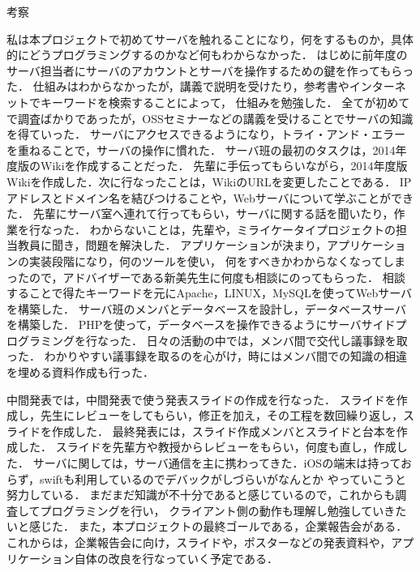 \par
考察
\par
私は本プロジェクトで初めてサーバを触れることになり，何をするものか，具体的にどうプログラミングするのかなど何もわからなかった．
はじめに前年度のサーバ担当者にサーバのアカウントとサーバを操作するための鍵を作ってもらった．
仕組みはわからなかったが，講義で説明を受けたり，参考書やインターネットでキーワードを検索することによって，
仕組みを勉強した．
全てが初めてで調査ばかりであったが，OSSセミナーなどの講義を受けることでサーバの知識を得ていった．
サーバにアクセスできるようになり，トライ・アンド・エラーを重ねることで，サーバの操作に慣れた．
サーバ班の最初のタスクは，2014年度版のWikiを作成することだった．
先輩に手伝ってもらいながら，2014年度版Wikiを作成した．次に行なったことは，WikiのURLを変更したことである．
IPアドレスとドメイン名を結びつけることや，Webサーバについて学ぶことができた．
先輩にサーバ室へ連れて行ってもらい，サーバに関する話を聞いたり，作業を行なった．
わからないことは，先輩や，ミライケータイプロジェクトの担当教員に聞き，問題を解決した．
アプリケーションが決まり，アプリケーションの実装段階になり，何のツールを使い，
何をすべきかわからなくなってしまったので，アドバイザーである新美先生に何度も相談にのってもらった．
相談することで得たキーワードを元にApache，LINUX，MySQLを使ってWebサーバを構築した．
サーバ班のメンバとデータベースを設計し，データベースサーバを構築した．
PHPを使って，データベースを操作できるようにサーバサイドプログラミングを行なった．
日々の活動の中では，メンバ間で交代し議事録を取った．
わかりやすい議事録を取るのを心がけ，時にはメンバ間での知識の相違を埋める資料作成も行った．
\par
中間発表では，中間発表で使う発表スライドの作成を行なった．
スライドを作成し，先生にレビューをしてもらい，修正を加え，その工程を数回繰り返し，スライドを作成した．
最終発表には，スライド作成メンバとスライドと台本を作成した．
スライドを先輩方や教授からレビューをもらい，何度も直し，作成した．
サーバに関しては，サーバ通信を主に携わってきた．iOSの端末は持っておらず，swiftも利用しているのでデバックがしづらいがなんとか
やっていこうと努力している．
まだまだ知識が不十分であると感じているので，これからも調査してプログラミングを行い，
クライアント側の動作も理解し勉強していきたいと感じた．
また，本プロジェクトの最終ゴールである，企業報告会がある．
これからは，企業報告会に向け，スライドや，ポスターなどの発表資料や，アプリケーション自体の改良を行なっていく予定である．
\par
{}
